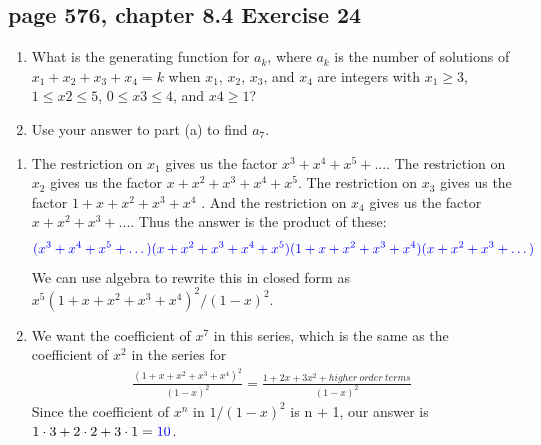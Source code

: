 \documentclass[sigconf]{acmart}
\newcommand{\answer}[2]{%
  \if\relax\detokenize{#2}\relax
    \underline{\mbox{請作答}}%
  \else
    \textcolor{blue}{#2}%
  \fi
}
\begin{document}
\subsection{page 576, chapter 8.4 Exercise 24}
\begin{shaded}
    \begin{enumerate}[label=(\alph*)]
        \item What is the generating function for {$a_k$}, where $a_k$ is the number of solutions of $x_1 + x_2 + x_3 + x_4 = k$ when $x_1$, $x_2$, $x_3$, and $x_4$ are integers with $x_1 \ge 3$, $1 \le x2 \le 5$, $0 \le x3 \le 4$, and $x4 \ge 1$?
        \item Use your answer to part (a) to find $a_7$.
    \end{enumerate}
\end{shaded}
\begin{enumerate}[label=(\alph*)]
        \item The restriction on $x_1$ gives us the factor $x^3 + x^4 + x^5 + ...$. The restriction on $x_2$ gives us the factor $x + x^2 + x^3 + x^4 + x^5$. The restriction on $x_3$ gives us the factor $1 + x + x^2 + x^3 + x^4$ . And the restriction on $x_4$ gives us the factor $x + x^2 + x^3 + ...$. Thus the answer is the product of these:
            \begin{eqnarray*}
                \answer{8.4.24a}{(x^3 + x^4 + x^5 + \dots)(x + x^2 + x^3 + x^4 + x^5)(1 + x + x^2 + x^3 + x^4)(x + x^2 + x^3 + \dots)}
            \end{eqnarray*}
        We can use algebra to rewrite this in closed form as $x^5(1 + x + x^2 + x^3 + x^4)^2/(1 - x)^2$.
        \item We want the coefficient of $x^7$ in this series, which is the same as the coefficient of $x^2$ in the series for
            \begin{eqnarray*}
            \frac{(1 + x + x^2 + x^3 + x^4)^2}{(1 - x)^2} = \frac{1+2x+3x^2+higher\ order\ terms}{(1 - x)^2}
            \end{eqnarray*}
        Since the coefficient of $x^n$ in $1/(1 - x)^2$ is n + 1, our answer is $1 \cdot 3 + 2 \cdot 2 + 3 \cdot 1 = \answer{8.4.24b}{10}$.
\end{enumerate}
\end{document}
